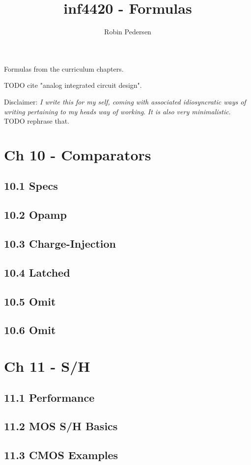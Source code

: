 \documentclass[a4paper,twocolumn]{article}
\begin{document}
  \title{inf4420 - Formulas}
  \author{Robin Pedersen}
  \maketitle

  Formulas from the curriculum chapters.

  TODO cite "analog integrated circuit design".

  Disclaimer: \emph{I write this for my self, coming with associated
  idiosyncratic ways of writing pertaining to my heads way of working}.
  \emph{It is also very minimalistic}.
  TODO rephrase that.

  \section{Ch 10 - Comparators}
    \subsection{10.1 Specs}
    \subsection{10.2 Opamp}
    \subsection{10.3 Charge-Injection}
    \subsection{10.4 Latched}
    \subsection{10.5 Omit}
    \subsection{10.6 Omit}
  \section{Ch 11 - S/H}
    \subsection{11.1 Performance}
    \subsection{11.2 MOS S/H Basics}
    \subsection{11.3 CMOS Examples}
\end{document}

